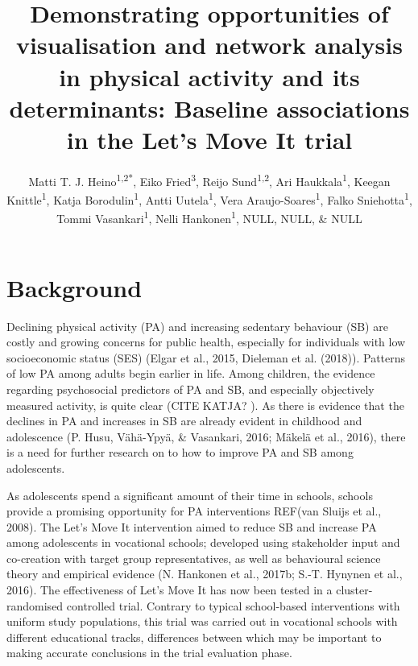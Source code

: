 \documentclass[english,floatsintext,]{apa6}
\title{Demonstrating opportunities of visualisation and network analysis in
physical activity and its determinants: Baseline associations in the
Let's Move It trial}
\author{Matti T. J. Heino\textsuperscript{1,2*}, Eiko Fried\textsuperscript{3}, Reijo Sund\textsuperscript{1,2}, Ari Haukkala\textsuperscript{1}, Keegan Knittle\textsuperscript{1}, Katja Borodulin\textsuperscript{1}, Antti Uutela\textsuperscript{1}, Vera Araujo-Soares\textsuperscript{1}, Falko Sniehotta\textsuperscript{1}, Tommi Vasankari\textsuperscript{1}, Nelli Hankonen\textsuperscript{1}, NULL, NULL, \& NULL}
\theoremstyle{definition}
\theoremstyle{definition}
\theoremstyle{definition}
\theoremstyle{remark}
\begin{document}
\maketitle

\setcounter{secnumdepth}{0}



\newpage

\section{Background}\label{background}

Declining physical activity (PA) and increasing sedentary behaviour (SB)
are costly and growing concerns for public health, especially for
individuals with low socioeconomic status (SES) (Elgar et al., 2015,
Dieleman et al. (2018)). Patterns of low PA among adults begin earlier
in life. Among children, the evidence regarding psychosocial predictors
of PA and SB, and especially objectively measured activity, is quite
clear (CITE KATJA? ). As there is evidence that the declines in PA and
increases in SB are already evident in childhood and adolescence (P.
Husu, Vähä-Ypyä, \& Vasankari, 2016; Mäkelä et al., 2016), there is a
need for further research on to how to improve PA and SB among
adolescents.

As adolescents spend a significant amount of their time in schools,
schools provide a promising opportunity for PA interventions REF(van
Sluijs et al., 2008). The Let's Move It intervention aimed to reduce SB
and increase PA among adolescents in vocational schools; developed using
stakeholder input and co-creation with target group representatives, as
well as behavioural science theory and empirical evidence (N. Hankonen
et al., 2017b; S.-T. Hynynen et al., 2016). The effectiveness of Let's
Move It has now been tested in a cluster-randomised controlled trial.
Contrary to typical school-based interventions with uniform study
populations, this trial was carried out in vocational schools with
different educational tracks, differences between which may be important
to making accurate conclusions in the trial evaluation phase.
\end{document}
